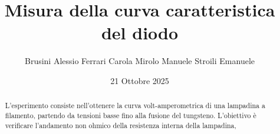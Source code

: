 \documentclass[10pt,twocolumn]{article}
\begin{document}
\justifying
	\title{\textbf{Misura della curva caratteristica del diodo}}
	\author{Brusini Alessio \hspace{0.7cm} Ferrari Carola \hspace{0.7cm} Mirolo Manuele \hspace{0.7cm} Stroili Emanuele}
	\date{21 Ottobre 2025}
	\maketitle
	\onecolumn
	\tableofcontents
\vspace{3cm}
	\begin{abstract}
		\centering
		\large
    L'esperimento consiste nell'ottenere la curva volt-amperometrica di una 
    lampadina a filamento, partendo da tensioni basse fino alla fusione del 
    tungsteno. L'obiettivo è verificare l'andamento non ohmico della resistenza
    interna della lampadina, 
       
	\end{abstract}

	\newpage
\restoregeometry
\twocolumn
\end{document}
